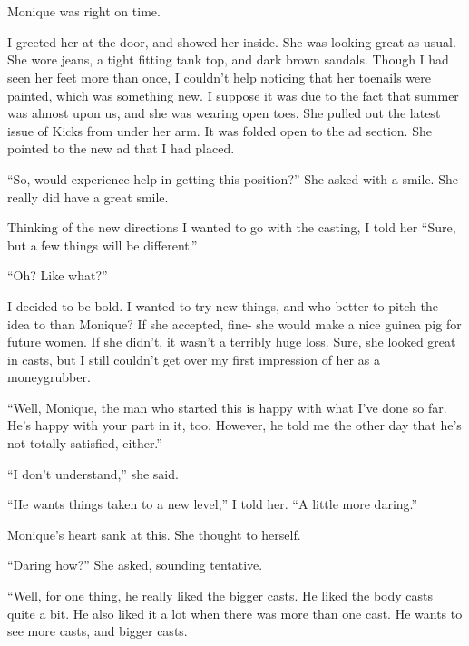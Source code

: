 \chapter{}
Monique was right on time.

I greeted her at the door, and showed her inside. She was looking great as usual. She wore
jeans, a tight fitting tank top, and dark brown sandals. Though I had seen her feet more than
once, I couldn't help noticing that her toenails were painted, which was something new. I
suppose it was due to the fact that summer was almost upon us, and she was wearing open toes.
She pulled out the latest issue of Kicks from under her arm. It was folded open to the ad
section. She pointed to the new ad that I had placed.

``So, would experience help in getting this position?'' She asked with a smile. She really
did have a great smile.

Thinking of the new directions I wanted to go with the casting, I told her ``Sure, but a few
things will be different.''

``Oh? Like what?''

I decided to be bold. I wanted to try new things, and who better to pitch the idea to than
Monique? If she accepted, fine- she would make a nice guinea pig for future women. If she
didn't, it wasn't a terribly huge loss. Sure, she looked great in casts, but I still couldn't
get over my first impression of her as a moneygrubber.

``Well, Monique, the man who started this is happy with what I've done so far. He's happy
with your part in it, too. However, he told me the other day that he's not totally satisfied,
either.''

``I don't understand,'' she said.

``He wants things taken to a new level,'' I told her. ``A little more daring.''

Monique's heart sank at this.  She thought to herself.

``Daring how?'' She asked, sounding tentative.

``Well, for one thing, he really liked the bigger casts. He liked the body casts quite a
bit. He also liked it a lot when there was more than one cast. He wants to see more casts, and
bigger casts.

